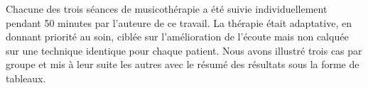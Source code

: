 Chacune des trois  séances de musicothérapie a été suivie individuellement  pendant 50 minutes par 
 l'auteure de ce 
 travail.
   La thérapie était 
   adaptative, en donnant priorité au soin, ciblée sur l'amélioration de l'écoute mais non calquée sur une 
   technique identique pour 
   chaque 
   patient.   
  Nous avons illustré trois cas par groupe  et mis à leur suite les autres avec le résumé des 
 résultats 
 sous la forme de tableaux.
 
 
 
 








